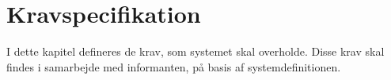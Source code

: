 \chapter{Kravspecifikation}
I dette kapitel defineres de krav, som systemet skal overholde. Disse krav skal findes i samarbejde med informanten, på basis af systemdefinitionen.